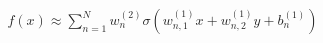 \documentclass[preview]{standalone}
\begin{document}
\begin{align*}
f(x) \approx  \sum_{n=1}^{N} w_n^{(2)} \sigma(w_{n,1}^{(1)}x + w_{n,2}^{(1)}y +b_n^{(1)})
\end{align*}
\end{document}
